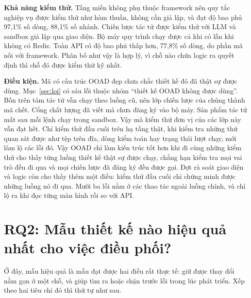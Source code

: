 \textbf{Khả năng kiểm thử.} Tầng miền không phụ thuộc framework nên quy tắc nghiệp vụ được kiểm thử như hàm thuần, không cần giả lập, và đạt độ bao phủ 97,1\% số dòng, 88,1\% số nhánh. Chiến lược tác tử được kiểm thử với LLM và sandbox giả lập qua giao diện. Bộ máy quy trình chạy được cả khi có lẫn khi không có Redis. Toàn API có độ bao phủ thấp hơn, 77,8\% số dòng, do phần mã nối với framework. Phân bố như vậy là hợp lý, vì chỗ nào chứa logic ra quyết định thì chỗ đó được kiểm thử kỹ nhất.

\textbf{Điều kiện.} Mã có cấu trúc OOAD đẹp chưa chắc thiết kế đó đã thật sự được dùng. Mục~\ref{sec:loi} có sáu lỗi thuộc nhóm ``thiết kế OOAD không được dùng''. Bốn trên tám tác tử vẫn chạy theo luồng cũ, nên lớp chiến lược của chúng thành mã chết. Cổng chất lượng đã viết mà chưa đăng ký vào bộ máy. Sản phẩm tác tử mất sau mỗi lệnh chạy trong sandbox. Vậy mà kiểm thử đơn vị của các lớp này vẫn đạt hết. Chỉ kiểm thử đầu cuối trên hạ tầng thật, khi kiểm tra những thứ quan sát được như tệp trên đĩa, dòng kiểm toán hay trạng thái lượt chạy, mới làm lộ các lỗi đó. Vậy OOAD chỉ làm kiến trúc tốt hơn khi đi cùng những kiểm thử cho thấy từng luồng thiết kế thật sự được chạy, chẳng hạn kiểm tra mọi vai trò đều đi qua  và mọi chiến lược đã đăng ký đều được gọi. Đợt rà soát giao diện và logic còn cho thấy thêm một điều: kiểm thử đầu cuối chỉ chứng minh được những luồng nó đi qua. Mười ba lỗi nằm ở các thao tác ngoài luồng chính, và chỉ lộ ra khi đọc từng màn hình rồi so với API.

\section{RQ2: Mẫu thiết kế nào hiệu quả nhất cho việc điều phối?}

Ở đây, mẫu hiệu quả là mẫu đạt được hai điều rất thực tế: giữ được thay đổi nằm gọn ở một chỗ, và giúp tìm ra hoặc chặn trước lỗi trong lúc phát triển. Xếp theo hai tiêu chí đó thì thứ tự như sau.

